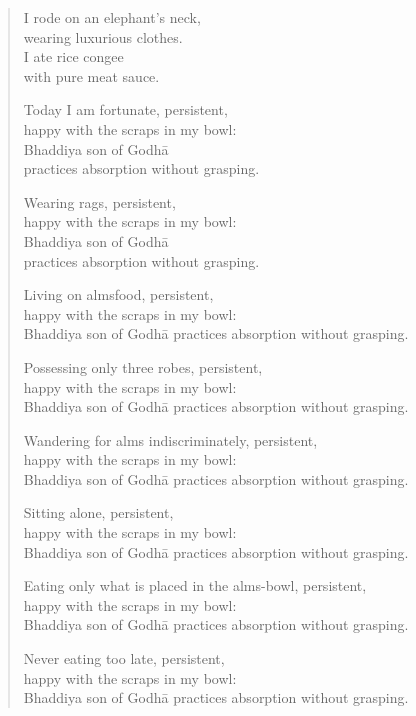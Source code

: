 \documentclass[12pt,openany]{book}%
\begin{document}
\begin{verse}%
I rode on an elephant’s neck, \\
wearing luxurious clothes. \\
I ate rice congee \\
with pure meat sauce. 

Today I am fortunate, persistent, \\
happy with the scraps in my bowl: \\
Bhaddiya son of \textsanskrit{Godhā} \\
practices absorption without grasping. 

Wearing rags, persistent, \\
happy with the scraps in my bowl: \\
Bhaddiya son of \textsanskrit{Godhā} \\
practices absorption without grasping. 

Living on almsfood, persistent, \\
happy with the scraps in my bowl: \\
Bhaddiya son of \textsanskrit{Godhā} practices absorption without grasping. 

Possessing only three robes, persistent, \\
happy with the scraps in my bowl: \\
Bhaddiya son of \textsanskrit{Godhā} practices absorption without grasping. 

Wandering for alms indiscriminately, persistent, \\
happy with the scraps in my bowl: \\
Bhaddiya son of \textsanskrit{Godhā} practices absorption without grasping. 

Sitting alone, persistent, \\
happy with the scraps in my bowl: \\
Bhaddiya son of \textsanskrit{Godhā} practices absorption without grasping. 

Eating only what is placed in the alms-bowl, persistent, \\
happy with the scraps in my bowl: \\
Bhaddiya son of \textsanskrit{Godhā} practices absorption without grasping. 

Never eating too late, persistent, \\
happy with the scraps in my bowl: \\
Bhaddiya son of \textsanskrit{Godhā} practices absorption without grasping. 


\end{verse}
\end{document}
